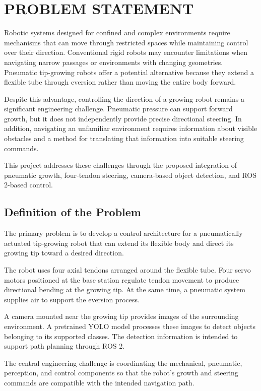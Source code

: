 \chapter{PROBLEM STATEMENT}

Robotic systems designed for confined and complex environments require mechanisms that can move through restricted spaces while maintaining control over their direction. Conventional rigid robots may encounter limitations when navigating narrow passages or environments with changing geometries. Pneumatic tip-growing robots offer a potential alternative because they extend a flexible tube through eversion rather than moving the entire body forward.

Despite this advantage, controlling the direction of a growing robot remains a significant engineering challenge. Pneumatic pressure can support forward growth, but it does not independently provide precise directional steering. In addition, navigating an unfamiliar environment requires information about visible obstacles and a method for translating that information into suitable steering commands.

This project addresses these challenges through the proposed integration of pneumatic growth, four-tendon steering, camera-based object detection, and ROS 2-based control.

\section{Definition of the Problem}

The primary problem is to develop a control architecture for a pneumatically actuated tip-growing robot that can extend its flexible body and direct its growing tip toward a desired direction.

The robot uses four axial tendons arranged around the flexible tube. Four servo motors positioned at the base station regulate tendon movement to produce directional bending at the growing tip. At the same time, a pneumatic system supplies air to support the eversion process.

A camera mounted near the growing tip provides images of the surrounding environment. A pretrained YOLO model processes these images to detect objects belonging to its supported classes. The detection information is intended to support path planning through ROS 2.

The central engineering challenge is coordinating the mechanical, pneumatic, perception, and control components so that the robot's growth and steering commands are compatible with the intended navigation path.

